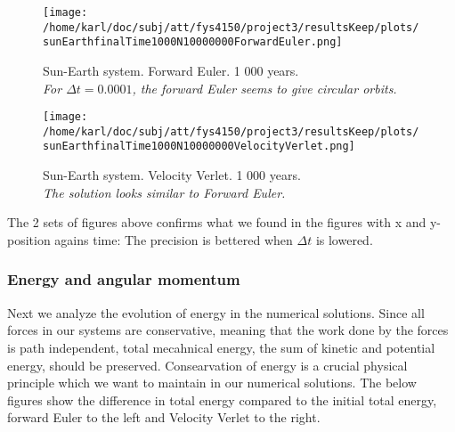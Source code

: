 \documentclass{article}
\begin{document}
\begin{minipage}{.45\textwidth} 
	\begin{figure}[H]
		\centering
		\texttt{[image: /home/karl/doc/subj/att/fys4150/project3/resultsKeep/plots/sunEarthfinalTime1000N10000000ForwardEuler.png]}
		\caption{Sun-Earth system. Forward Euler. 1 000 years. \\ \textit{For $\Delta t = 0.0001$, the forward Euler seems to give circular orbits.}}
		\label{1}
	\end{figure}
\end{minipage}\hfill
\begin{minipage}{.45\textwidth} 
	\begin{figure}[H]
		\centering
		\texttt{[image: /home/karl/doc/subj/att/fys4150/project3/resultsKeep/plots/sunEarthfinalTime1000N10000000VelocityVerlet.png]}
		\caption{Sun-Earth system. Velocity Verlet. 1 000 years. \\ \textit{The solution looks similar to Forward Euler.}}
		\label{1}
	\end{figure}
\end{minipage}\hfill
\vspace{2ex}

The 2 sets of figures above confirms what we found in the figures with x and y-position agains time: The precision is bettered when $\Delta t$ is lowered. 

\subsubsection{Energy and angular momentum}
Next we analyze the evolution of energy in the numerical solutions. Since all forces in our systems are conservative, meaning that the work done by the forces is path independent, total mecahnical energy, the sum of kinetic and potential energy, should be preserved. Consearvation of energy is a crucial physical principle which we want to maintain in our numerical solutions. The below figures show the difference in total energy compared to the initial total energy, forward Euler to the left and Velocity Verlet to the right.
\end{document}

